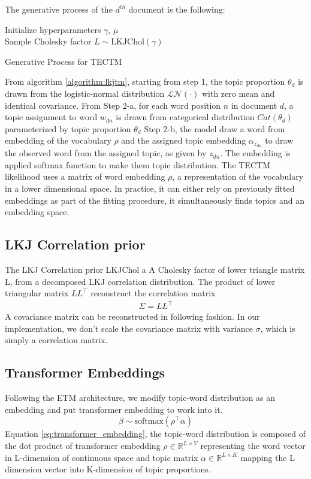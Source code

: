 The generative process of the $ d^{th} $ document is the following:\\
\begin{algorithm}[H]
Initialize hyperparameters $ \gamma $, $ \mu $\\
Sample Cholesky factor $ L\sim \text{LKJChol}(\gamma)$\\
\caption{Generative Process for TECTM}
\label{algorithm:lkjtm}
\end{algorithm}
From algorithm \ref{algorithm:lkjtm}, starting from step 1, the topic proportion $ \theta_d $ is drawn from the logistic-normal distribution $ \mathcal{LN}(\cdot) $ with zero mean and identical covariance.
From Step 2-a, for each word position $ n $ in document $ d $, a topic assignment to word $ w_{dn} $ is drawn from categorical distribution $ Cat(\theta_d) $ parameterized by topic proportion $ \theta_d $
Step 2-b, the model draw a word from embedding of the vocabulary $ \rho $ and the assigned topic embedding $ \alpha_{z_{dn}} $ to draw the observed word from the assigned topic, as given by $ z_{dn} $. The embedding is applied softmax function to make them topic distribution.
The TECTM likelihood uses a matrix of word embedding $ \rho $, a representation of the vocabulary in a lower dimensional space. In practice, it can either rely on previously fitted embeddings as part of the fitting procedure, it simultaneously finds topics and an embedding space.
\subsection{LKJ Correlation prior}
The LKJ Correlation prior LKJChol a A Cholesky factor of lower triangle matrix L, from a decomposed LKJ correlation distribution. The product of lower triangular matrix $ LL^\top $ reconstruct the correlation matrix
\begin{align*}
\Sigma = LL^\top
\end{align*}
A covariance matrix can be reconstructed in following fashion.
In our implementation, we don't scale the covariance matrix with variance $ \sigma $, which is simply a correlation matrix.
\subsection{Transformer Embeddings}
Following the ETM architecture, we modify topic-word distribution as an embedding and put transformer embedding to work into it. 
\begin{equation}\label{eq:ch4_transformer_embedding}
\beta\sim\text{softmax}(\rho^\top\alpha)
\end{equation}
Equation \ref{eq:transformer_embedding}, the topic-word distribution is composed of the dot product of transformer embedding $ \rho\in\mathbb{R}^{L\times V} $ representing the word vector in L-dimension of continuous space and topic matrix $ \alpha\in\mathbb{R}^{L\times K} $ mapping the L dimension vector into K-dimension of topic proportions.

